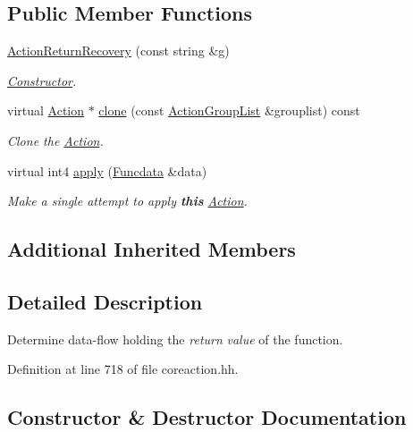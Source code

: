 \subsection*{Public Member Functions}
\begin{DoxyCompactItemize}
\item 
\mbox{\hyperlink{class_action_return_recovery_a01d08c23135a3e1a7352803003308b65}{Action\+Return\+Recovery}} (const string \&g)
\begin{DoxyCompactList}\small\item\em \mbox{\hyperlink{class_constructor}{Constructor}}. \end{DoxyCompactList}\item 
virtual \mbox{\hyperlink{class_action}{Action}} $\ast$ \mbox{\hyperlink{class_action_return_recovery_a5871a6ac754811bf330d21aa2b375714}{clone}} (const \mbox{\hyperlink{class_action_group_list}{Action\+Group\+List}} \&grouplist) const
\begin{DoxyCompactList}\small\item\em Clone the \mbox{\hyperlink{class_action}{Action}}. \end{DoxyCompactList}\item 
virtual int4 \mbox{\hyperlink{class_action_return_recovery_aaad5058cd2347ea61be24b63f8b17d60}{apply}} (\mbox{\hyperlink{class_funcdata}{Funcdata}} \&data)
\begin{DoxyCompactList}\small\item\em Make a single attempt to apply {\bfseries{this}} \mbox{\hyperlink{class_action}{Action}}. \end{DoxyCompactList}\end{DoxyCompactItemize}
\subsection*{Additional Inherited Members}


\subsection{Detailed Description}
Determine data-\/flow holding the {\itshape return} {\itshape value} of the function. 

Definition at line 718 of file coreaction.\+hh.



\subsection{Constructor \& Destructor Documentation}
\mbox{\label{class_action_return_recovery_a01d08c23135a3e1a7352803003308b65}} 
